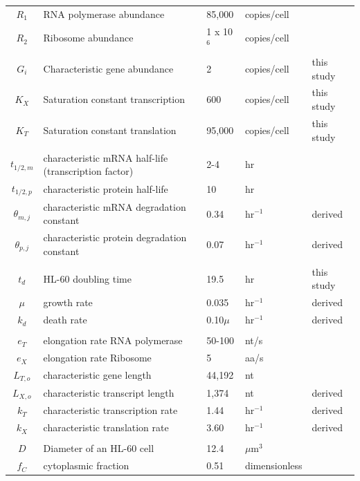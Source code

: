 \documentclass[12pt]{article}
\begin{document}
\begin{center}

	\label{tbl:model-parameters}
	\begin{scriptsize}
	\begin{supertabular}{c|l|l|l|l}
	\hline

	$R_{1}$ & RNA polymerase abundance & 85,000 & copies/cell & \cite{Jackson:2000aa,Zhao:2014aa} \\
	$R_{2}$ & Ribosome abundance & 1 x 10$^{6}$ & copies/cell & \cite{Freitas2004} \\
	$G_{i}$ & Characteristic gene abundance & 2 & copies/cell & this study\\
	$K_{X}$ & Saturation constant transcription & 600 & copies/cell & this study\\
	$K_{T}$ & Saturation constant translation & 95,000 & copies/cell & this study\\
	& & & & \\
	$t_{1/2,m}$ & characteristic mRNA half-life (transcription factor) & 2-4 & hr & \cite{Yang:2003aa} \\
	$t_{1/2,p}$ & characteristic protein half-life & 10 & hr & \cite{Doherty:2009aa} \\
	$\theta_{m,j}$ & characteristic mRNA degradation constant & 0.34 & hr$^{-1}$ & derived \\
	$\theta_{p,j}$ & characteristic protein degradation constant & 0.07 & hr$^{-1}$ & derived \\
	& & & & \\
	$t_{d}$ & HL-60 doubling time & 19.5 & hr & this study \\
	$\mu$ & growth rate & 0.035 & hr$^{-1}$ & derived \\
	$k_{d}$ & death rate & 0.10$\mu$ & hr$^{-1}$ & derived \\
	& & & & \\
	$e_{T}$ & elongation rate RNA polymerase & 50-100 & nt/s & \cite{Sehgal:1976aa,Darzacq:2007aa,Kos:2010aa,Darnell:2013aa} \\
	$e_{X}$ & elongation rate Ribosome & 5 & aa/s & \cite{Bostrom:1986aa} \\
	$L_{T,o}$ & characteristic gene length & 44,192 & nt & \cite{Meyers2004} \\
	$L_{X,o}$ & characteristic transcript length & 1,374 & nt & derived \\
	$k_{T}$ & characteristic transcription rate & 1.44 & hr$^{-1}$ & derived \\
	$k_{X}$ & characteristic translation rate & 3.60 & hr$^{-1}$ & derived \\
	& & & & \\
	$D$	& Diameter of an HL-60 cell & 12.4 & $\mu$m$^{3}$ & \cite{Rosenbluth:2006aa} \\
	$f_{C}$ & cytoplasmic fraction & 0.51 & dimensionless & \cite{Rosenbluth:2006aa} \\



\end{supertabular}
\end{scriptsize}
\end{center}
\end{document}

